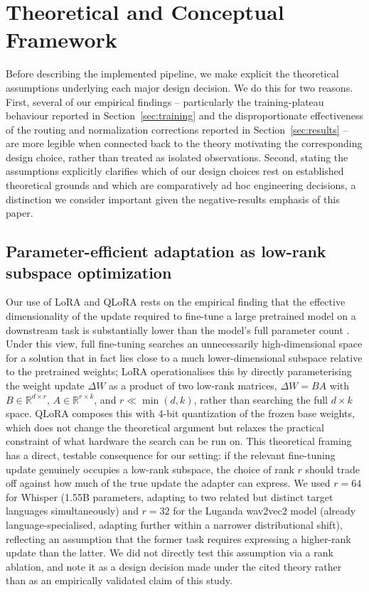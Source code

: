 \documentclass[11pt]{article}
\begin{document}
\section{Theoretical and Conceptual Framework}
\label{sec:theory}

Before describing the implemented pipeline, we make explicit the theoretical assumptions underlying each major design decision. We do this for two reasons. First, several of our empirical findings -- particularly the training-plateau behaviour reported in Section~\ref{sec:training} and the disproportionate effectiveness of the routing and normalization corrections reported in Section~\ref{sec:results} -- are more legible when connected back to the theory motivating the corresponding design choice, rather than treated as isolated observations. Second, stating the assumptions explicitly clarifies which of our design choices rest on established theoretical grounds and which are comparatively ad hoc engineering decisions, a distinction we consider important given the negative-results emphasis of this paper.

\subsection{Parameter-efficient adaptation as low-rank subspace optimization}

Our use of LoRA and QLoRA rests on the empirical finding that the effective dimensionality of the update required to fine-tune a large pretrained model on a downstream task is substantially lower than the model's full parameter count \cite{aghajanyan2021intrinsic}. Under this view, full fine-tuning searches an unnecessarily high-dimensional space for a solution that in fact lies close to a much lower-dimensional subspace relative to the pretrained weights; LoRA \cite{hu2022lora} operationalises this by directly parameterising the weight update $\Delta W$ as a product of two low-rank matrices, $\Delta W = BA$ with $B \in \mathbb{R}^{d \times r}$, $A \in \mathbb{R}^{r \times k}$, and $r \ll \min(d,k)$, rather than searching the full $d \times k$ space. QLoRA \cite{dettmers2023qlora} composes this with 4-bit quantization of the frozen base weights, which does not change the theoretical argument but relaxes the practical constraint of what hardware the search can be run on. This theoretical framing has a direct, testable consequence for our setting: if the relevant fine-tuning update genuinely occupies a low-rank subspace, the choice of rank $r$ should trade off against how much of the true update the adapter can express. We used $r=64$ for Whisper (1.55B parameters, adapting to two related but distinct target languages simultaneously) and $r=32$ for the Luganda wav2vec2 model (already language-specialised, adapting further within a narrower distributional shift), reflecting an assumption that the former task requires expressing a higher-rank update than the latter. We did not directly test this assumption via a rank ablation, and note it as a design decision made under the cited theory rather than as an empirically validated claim of this study.
\end{document}
